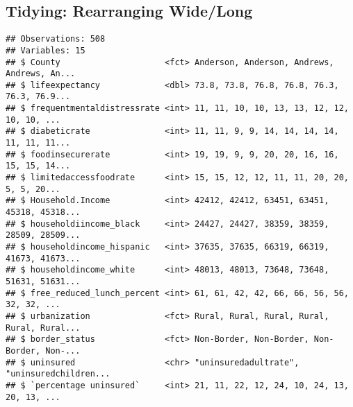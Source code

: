 \documentclass[]{article}
\newenvironment{Shaded}{\begin{snugshade}}{\end{snugshade}}
\newcommand{\CommentTok}[1]{\textcolor[rgb]{0.56,0.35,0.01}{\textit{#1}}}
\newcommand{\DataTypeTok}[1]{\textcolor[rgb]{0.13,0.29,0.53}{#1}}
\newcommand{\KeywordTok}[1]{\textcolor[rgb]{0.13,0.29,0.53}{\textbf{#1}}}
\newcommand{\NormalTok}[1]{#1}
\newcommand{\OperatorTok}[1]{\textcolor[rgb]{0.81,0.36,0.00}{\textbf{#1}}}
\newcommand{\StringTok}[1]{\textcolor[rgb]{0.31,0.60,0.02}{#1}}
\begin{document}
\hypertarget{tidying-rearranging-widelong}{%
\subsection{Tidying: Rearranging
Wide/Long}\label{tidying-rearranging-widelong}}

\begin{Shaded}
\end{Shaded}

\begin{verbatim}
## Observations: 508
## Variables: 15
## $ County                     <fct> Anderson, Anderson, Andrews, Andrews, An...
## $ lifeexpectancy             <dbl> 73.8, 73.8, 76.8, 76.8, 76.3, 76.3, 76.9...
## $ frequentmentaldistressrate <int> 11, 11, 10, 10, 13, 13, 12, 12, 10, 10, ...
## $ diabeticrate               <int> 11, 11, 9, 9, 14, 14, 14, 14, 11, 11, 11...
## $ foodinsecurerate           <int> 19, 19, 9, 9, 20, 20, 16, 16, 15, 15, 14...
## $ limitedaccessfoodrate      <int> 15, 15, 12, 12, 11, 11, 20, 20, 5, 5, 20...
## $ Household.Income           <int> 42412, 42412, 63451, 63451, 45318, 45318...
## $ householdiincome_black     <int> 24427, 24427, 38359, 38359, 28509, 28509...
## $ householdincome_hispanic   <int> 37635, 37635, 66319, 66319, 41673, 41673...
## $ householdincome_white      <int> 48013, 48013, 73648, 73648, 51631, 51631...
## $ free_reduced_lunch_percent <int> 61, 61, 42, 42, 66, 66, 56, 56, 32, 32, ...
## $ urbanization               <fct> Rural, Rural, Rural, Rural, Rural, Rural...
## $ border_status              <fct> Non-Border, Non-Border, Non-Border, Non-...
## $ uninsured                  <chr> "uninsuredadultrate", "uninsuredchildren...
## $ `percentage uninsured`     <int> 21, 11, 22, 12, 24, 10, 24, 13, 20, 13, ...
\end{verbatim}

\begin{Shaded}
\end{Shaded}
\end{document}
